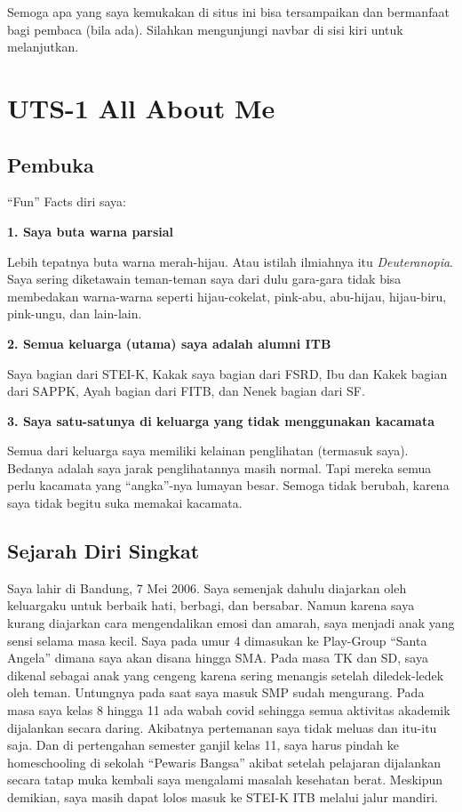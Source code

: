 \documentclass[
  letterpaper,
  DIV=11,
  numbers=noendperiod]{scrreprt}
\begin{document}
Semoga apa yang saya kemukakan di situs ini bisa tersampaikan dan
bermanfaat bagi pembaca (bila ada). Silahkan mengunjungi navbar di sisi
kiri untuk melanjutkan.


\chapter{UTS-1 All About Me}\label{uts-1-all-about-me}

\section{\texorpdfstring{\textbf{Pembuka}}{Pembuka}}\label{pembuka}

``Fun'' Facts diri saya:

\textbf{1. Saya buta warna parsial}

Lebih tepatnya buta warna merah-hijau. Atau istilah ilmiahnya itu
\emph{Deuteranopia}. Saya sering diketawain teman-teman saya dari dulu
gara-gara tidak bisa membedakan warna-warna seperti hijau-cokelat,
pink-abu, abu-hijau, hijau-biru, pink-ungu, dan lain-lain.

\textbf{2. Semua keluarga (utama) saya adalah alumni ITB}

Saya bagian dari STEI-K, Kakak saya bagian dari FSRD, Ibu dan Kakek
bagian dari SAPPK, Ayah bagian dari FITB, dan Nenek bagian dari SF.

\textbf{3. Saya satu-satunya di keluarga yang tidak menggunakan
kacamata}

Semua dari keluarga saya memiliki kelainan penglihatan (termasuk saya).
Bedanya adalah saya jarak penglihatannya masih normal. Tapi mereka semua
perlu kacamata yang ``angka''-nya lumayan besar. Semoga tidak berubah,
karena saya tidak begitu suka memakai kacamata.

\section{\texorpdfstring{\textbf{Sejarah Diri
Singkat}}{Sejarah Diri Singkat}}\label{sejarah-diri-singkat}

Saya lahir di Bandung, 7 Mei 2006. Saya semenjak dahulu diajarkan oleh
keluargaku untuk berbaik hati, berbagi, dan bersabar. Namun karena saya
kurang diajarkan cara mengendalikan emosi dan amarah, saya menjadi anak
yang sensi selama masa kecil. Saya pada umur 4 dimasukan ke Play-Group
``Santa Angela'' dimana saya akan disana hingga SMA. Pada masa TK dan
SD, saya dikenal sebagai anak yang cengeng karena sering menangis
setelah diledek-ledek oleh teman. Untungnya pada saat saya masuk SMP
sudah mengurang. Pada masa saya kelas 8 hingga 11 ada wabah covid
sehingga semua aktivitas akademik dijalankan secara daring. Akibatnya
pertemanan saya tidak meluas dan itu-itu saja. Dan di pertengahan
semester ganjil kelas 11, saya harus pindah ke homeschooling di sekolah
``Pewaris Bangsa'' akibat setelah pelajaran dijalankan secara tatap muka
kembali saya mengalami masalah kesehatan berat. Meskipun demikian, saya
masih dapat lolos masuk ke STEI-K ITB melalui jalur mandiri.
\end{document}
